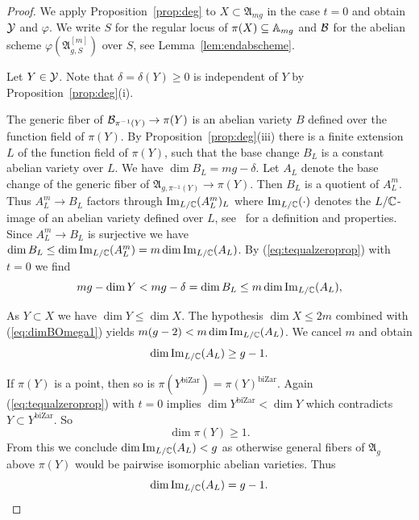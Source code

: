 \documentclass[12pt,oneside]{amsart}
\begin{document}
\begin{proof}
  We apply Proposition~\ref{prop:deg} to $X\subset\mathfrak{A}_{mg}$
  in the case $t=0$
  and obtain ${\mathcal Y}$ and $\varphi$. We write $S$ for the regular locus of
  $\pi(X)\subseteq{\mathbb{A}}_{mg}$ and $\mathcal{B}$ for the abelian scheme
  $\varphi(\mathfrak{A}_{g,S}^{[m]})$ over $S$, see Lemma~\ref{lem:endabscheme}.
  
  Let $Y\in {\mathcal Y}$. Note that $\delta=\delta(Y)\ge 0$ is independent of $Y$ by 
  Proposition~\ref{prop:deg}(i).

  The generic fiber of $\mathcal{B}_{\pi^{-1}(Y)}\rightarrow\pi(Y)$ is an abelian variety $B$
  defined over the function field of $\pi(Y)$. 
  By Proposition~\ref{prop:deg}(iii) there is a finite
  extension $L$  of the function field of $\pi(Y)$, such 
  that the base change $B_{L}$ is a constant abelian variety over
  $L$. We have $\dim B_L= mg-\delta$. Let $A_L$ denote the base change
  of the generic fiber of $\mathfrak{A}_{g,\pi^{-1}(Y)}\rightarrow\pi(Y)$. Then $B_L$ is a quotient
  of $A_L^m$.
  Thus $A_L^m\rightarrow B_{L}$ factors
  through $\mathrm{Im}_{L/{\mathbb{C}}}(A_L^m)_L$ where
  $\mathrm{Im}_{L/{\mathbb{C}}}(\cdot)$ denotes  the $L/{\mathbb{C}}$-image of an
  abelian variety defined over $L$, see~\cite{Conrad} for a definition
  and properties.
  Since $A_L^m\rightarrow B_L$ is surjective
  we have $\dim B_L \le \dim     \mathrm{Im}_{L/{\mathbb{C}}}(A_L^m) = m\dim \mathrm{Im}_{L/{\mathbb{C}}}(A_L)$.
  By
  (\ref{eq:tequalzeroprop}) with $t=0$ we find
  \begin{equation}
    \label{eq:dimBOmega1}
    mg - \dim Y<
    mg-\delta = \dim B_L \le
    m\dim
    \mathrm{Im}_{L/{\mathbb{C}}}(A_L),  
  \end{equation}
  
  As $Y\subset X$ we have $ \dim Y \le \dim X$. The hypothesis $\dim X \le 2m$
  combined with (\ref{eq:dimBOmega1}) yields $m(g-2) < m \dim
  \mathrm{Im}_{L/{\mathbb{C}}}(A_L)$. We cancel $m$ and 
  obtain
  \begin{equation*}
    \dim \mathrm{Im}_{L/{\mathbb{C}}}(A_L)  \ge g-1.  
  \end{equation*}  

  If $\pi(Y)$ is a point, then so is $\pi(Y^{\mathrm{biZar}}) =
  \pi(Y)^{\mathrm{biZar}}$. Again (\ref{eq:tequalzeroprop}) with $t=0$ implies
  $\dim Y^{\mathrm{biZar}} < \dim Y$ which contradicts $Y\subset
  Y^{\mathrm{biZar}}$. So 
  $$\dim \pi(Y)\ge 1.$$
  From this we conclude  $\dim \mathrm{Im}_{L/{\mathbb{C}}}(A_L) <
  g$ as otherwise  general fibers of  $\mathfrak{A}_g$ above $\pi(Y)$ would
  be pairwise isomorphic abelian varieties. Thus
  \begin{equation*}
    \dim
    \mathrm{Im}_{L/{\mathbb{C}}}(A_L)=
    g-1.
  \end{equation*}


\end{proof}
\end{document}
